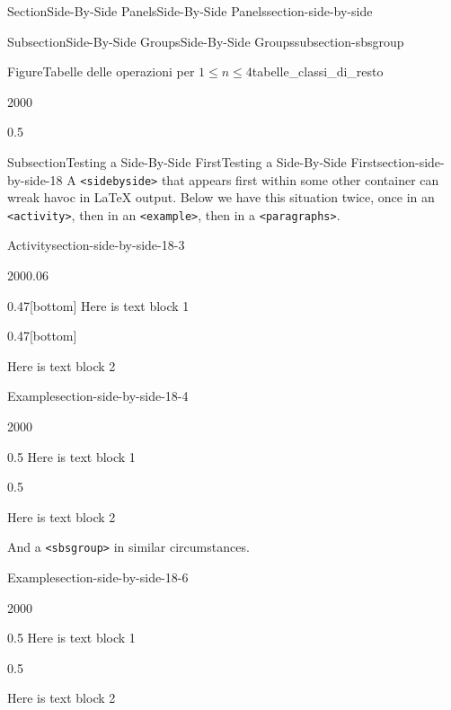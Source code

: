 \documentclass[twoside,10pt,]{article}
\newcommand{\mono}[1]{\texttt{#1}}
\numberwithin{equation}{section}
\begin{document}
\begin{sectionptx}{Section}{Side-By-Side Panels}{}{Side-By-Side Panels}{}{}{section-side-by-side}
\begin{subsectionptx}{Subsection}{Side-By-Side Groups}{}{Side-By-Side Groups}{}{}{subsection-sbsgroup}
\begin{figureptx}{Figure}{Tabelle delle operazioni per \(1\le n\le 4\)}{tabelle_classi_di_resto}{}
\begin{sidebyside}{2}{0}{0}{0}
\begin{sbspanel}{0.5}
\end{sbspanel}%
\end{sidebyside}%
\tcblower
\end{figureptx}%
\end{subsectionptx}
%
%
\typeout{************************************************}
\typeout{************************************************}
%
\begin{subsectionptx}{Subsection}{Testing a Side-By-Side First}{}{Testing a Side-By-Side First}{}{}{section-side-by-side-18}
A \mono{<sidebyside>} that appears first within some other container can wreak havoc in \LaTeX{} output.  Below we have this situation twice, once in an \mono{<activity>}, then in an \mono{<example>}, then in a \mono{<paragraphs>}.%
\begin{activity}{Activity}{}{section-side-by-side-18-3}%
\begin{sidebyside}{2}{0}{0}{0.06}%
\begin{sbspanel}{0.47}[bottom]%
Here is text block 1%
\end{sbspanel}%
\begin{sbspanel}{0.47}[bottom]%
\par
Here is text block 2%
\end{sbspanel}%
\end{sidebyside}%
\end{activity}%
\begin{example}{Example}{}{section-side-by-side-18-4}%
\begin{sidebyside}{2}{0}{0}{0}%
\begin{sbspanel}{0.5}%
Here is text block 1%
\end{sbspanel}%
\begin{sbspanel}{0.5}%
\par
Here is text block 2%
\end{sbspanel}%
\end{sidebyside}%
\end{example}
And a \mono{<sbsgroup>} in similar circumstances.%
\begin{example}{Example}{}{section-side-by-side-18-6}%
\begin{sidebyside}{2}{0}{0}{0}%
\begin{sbspanel}{0.5}%
Here is text block 1%
\end{sbspanel}%
\begin{sbspanel}{0.5}%
\par
Here is text block 2%
\end{sbspanel}%

\end{sidebyside}
\end{example}
\end{subsectionptx}
\end{sectionptx}
\end{document}
